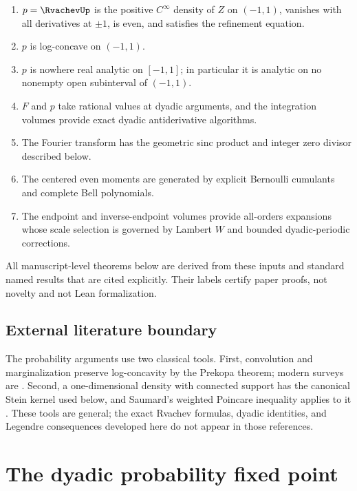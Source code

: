 \documentclass[11pt,oneside]{article}
\theoremstyle{definition}
\theoremstyle{remark}
\begin{document}
\begin{enumerate}
\item $p=\RvachevUp$ is the positive $C^\infty$ density of $Z$ on $(-1,1)$, vanishes
with all derivatives at $\pm1$, is even, and satisfies the refinement equation.
\item $p$ is log-concave on $(-1,1)$.
\item $p$ is nowhere real analytic on $[-1,1]$; in particular it is analytic on
no nonempty open subinterval of $(-1,1)$.
\item $F$ and $p$ take rational values at dyadic arguments, and the integration
volumes provide exact dyadic antiderivative algorithms.
\item The Fourier transform has the geometric sinc product and integer zero
divisor described below.
\item The centered even moments are generated by explicit Bernoulli cumulants
and complete Bell polynomials.
\item The endpoint and inverse-endpoint volumes provide all-orders expansions
whose scale selection is governed by Lambert $W$ and bounded dyadic-periodic
corrections.
\end{enumerate}

All manuscript-level theorems below are derived from these inputs and standard
named results that are cited explicitly.  Their labels certify paper proofs, not
novelty and not Lean formalization.

\subsection{External literature boundary}
The probability arguments use two classical tools.  First, convolution and
marginalization preserve log-concavity by the Prekopa theorem; modern surveys are
\cite{samworth,saumardwellner}.  Second, a one-dimensional density with connected
support has the canonical Stein kernel used below, and Saumard's weighted Poincare
inequality applies to it \cite{saumard}.  These tools are general; the exact
Rvachev formulas, dyadic identities, and Legendre consequences developed here do
not appear in those references.

\section{The dyadic probability fixed point}
\end{document}
